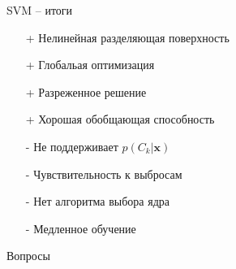 \documentclass[10pt]{beamer}
\begin{document}
\begin{frame}{SVM -- итоги}

\begin{itemize}
\item[+] Нелинейная разделяющая поверхность
\item[+] Глобальая оптимизация
\item[+] Разреженное решение
\item[+] Хорошая обобщающая способность
\item[-] Не поддерживает $p(C_k | \mathbf x)$
\item[-] Чувствительность к выбросам
\item[-] Нет алгоритма выбора ядра
\item[-] Медленное обучение
\end{itemize}

\end{frame}

\begin{frame}{}

\begin{center}
\Large Вопросы
\end{center}

\end{frame}
\end{document}
